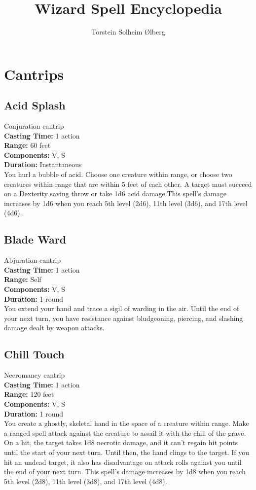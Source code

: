 \documentclass[11pt, A4paper, english]{article}
\author{Torstein Solheim Ølberg}
\title{Wizard Spell Encyclopedia}
\begin{document}
\maketitle

\tableofcontents

	\section{Cantrips}
		\subsection{Acid Splash}
Conjuration cantrip \\
\textbf{Casting Time:} 1 action \\
\textbf{Range:} 60 feet \\
\textbf{Components:} V, S \\
\textbf{Duration:} Instantaneous \\
You hurl a bubble of acid. Choose one creature within range, or choose two creatures within range that are within 5 feet of each other. A target must succeed on a Dexterity saving throw or take  1d6 acid damage.This spell's damage increases by 1d6 when you reach 5th level (2d6), 11th level (3d6), and 17th level (4d6).

		\subsection{Blade Ward}
Abjuration cantrip \\
\textbf{Casting Time:} 1 action \\
\textbf{Range:} Self \\
\textbf{Components:} V, S \\
\textbf{Duration:} 1 round \\
You extend your hand and trace a sigil of warding in the air. Until the end of your next turn, you have resistance against bludgeoning, piercing, and slashing damage dealt by weapon attacks.

		\subsection{Chill Touch}
Necromancy cantrip \\
\textbf{Casting Time:} 1 action \\
\textbf{Range:} 120 feet \\
\textbf{Components:} V, S \\
\textbf{Duration:} 1 round \\
You create a ghostly, skeletal hand in the space of a creature within range. Make a ranged spell attack against the creature to assail it with the chill of the grave. On a hit, the target takes 1d8 necrotic damage, and it can't regain hit points until the start of your next turn. Until then, the hand clings to the target. If you hit an undead target, it also has disadvantage on attack rolls against you until the end of your next turn. This spell's damage increases by 1d8 when you reach 5th level (2d8),  11th level (3d8), and 17th level (4d8).
\end{document}
